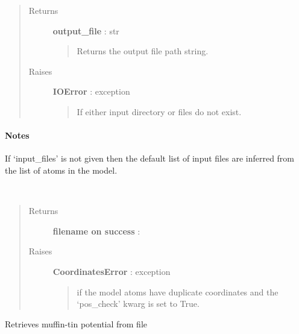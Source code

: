 \documentclass[letterpaper,10pt,english]{sphinxmanual}
\begin{document}
\begin{fulllineitems}
\begin{fulllineitems}
\begin{quote}
\begin{description}
\item[{Returns}] \leavevmode
\textbf{output\_file} : str
\begin{quote}

Returns the output file path string.
\end{quote}

\item[{Raises}] \leavevmode
\textbf{IOError} : exception
\begin{quote}

If either input directory or files do not exist.
\end{quote}

\end{description}\end{quote}
\paragraph{Notes}

If `input\_files' is not given then the default list of input files are 
inferred from the list of atoms in the model.

\end{fulllineitems}


\begin{fulllineitems}
\label{modules:phaseshifts.model.MTZ_model.gen_input}~\begin{quote}\begin{description}
\item[{Returns}] \leavevmode
\textbf{filename on success} :

\item[{Raises}] \leavevmode
\textbf{CoordinatesError} : exception
\begin{quote}

if the model atoms have duplicate coordinates and the `pos\_check' 
kwarg is set to True.
\end{quote}

\end{description}\end{quote}

\end{fulllineitems}


\begin{fulllineitems}
\label{modules:phaseshifts.model.MTZ_model.get_MTZ}
Retrieves muffin-tin potential from file


\end{fulllineitems}
\end{fulllineitems}
\end{document}
